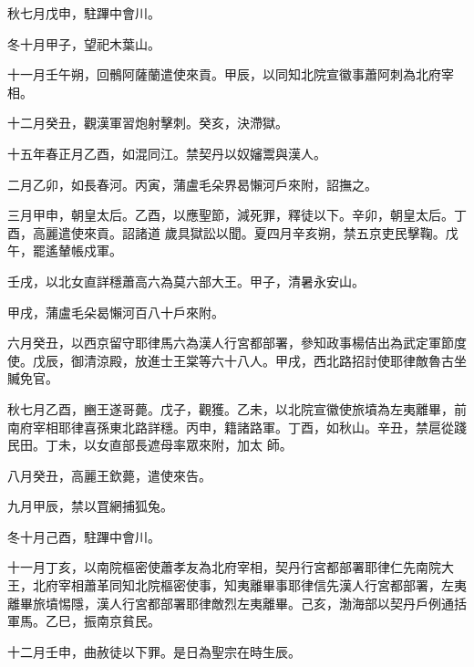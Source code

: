 \begin{pinyinscope}
 秋七月戊申，駐蹕中會川。



 冬十月甲子，望祀木葉山。



 十一月壬午朔，回鶻阿薩蘭遣使來貢。甲辰，以同知北院宣徽事蕭阿刺為北府宰相。



 十二月癸丑，觀漢軍習炮射擊刺。癸亥，決滯獄。



 十五年春正月乙酉，如混同江。禁契丹以奴嬸鬻與漢人。



 二月乙卯，如長春河。丙寅，蒲盧毛朵界曷懶河戶來附，詔撫之。



 三月甲申，朝皇太后。乙酉，以應聖節，減死罪，釋徒以下。辛卯，朝皇太后。丁酉，高麗遣使來貢。詔諸道
 歲具獄訟以聞。夏四月辛亥朔，禁五京吏民擊鞠。戊午，罷遙輦帳戍軍。



 壬戌，以北女直詳穩蕭高六為莫六部大王。甲子，清暑永安山。



 甲戌，蒲盧毛朵曷懶河百八十戶來附。



 六月癸丑，以西京留守耶律馬六為漢人行宮都部署，參知政事楊佶出為武定軍節度使。戊辰，御清涼殿，放進士王棠等六十八人。甲戌，西北路招討使耶律敵魯古坐贓免官。



 秋七月乙酉，豳王遂哥薨。戊子，觀獲。乙未，以北院宣徽使旅墳為左夷離畢，前南府宰相耶律喜孫東北路詳穩。丙申，籍諸路軍。丁酉，如秋山。辛丑，禁扈從踐民田。丁未，以女直部長遮母率眾來附，加太
 師。



 八月癸丑，高麗王欽薨，遣使來告。



 九月甲辰，禁以罝網捕狐兔。



 冬十月己酉，駐蹕中會川。



 十一月丁亥，以南院樞密使蕭孝友為北府宰相，契丹行宮都部署耶律仁先南院大王，北府宰相蕭革同知北院樞密使事，知夷離畢事耶律信先漢人行宮都部署，左夷離畢旅墳惕隱，漢人行宮都部署耶律敵烈左夷離畢。己亥，渤海部以契丹戶例通括軍馬。乙巳，振南京貧民。



 十二月壬申，曲赦徒以下罪。是日為聖宗在時生辰。



\end{pinyinscope}